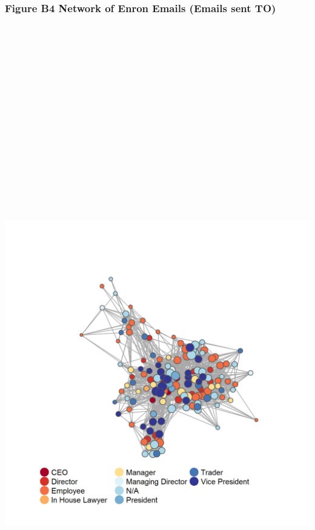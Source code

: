 \documentclass[]{article}
\begin{document}
\newpage

\subsubsection{Figure B4 Network of Enron Emails (Emails sent
TO)}\label{figure-b4-network-of-enron-emails-emails-sent-to}

\section{\texorpdfstring{\protect\includegraphics[height=12.50000in]{images/n_to.png}}{Network of Enron Emails}}\label{network-of-enron-emails-1}
\end{document}
